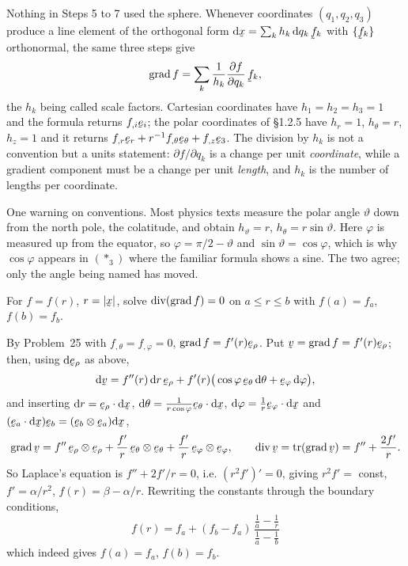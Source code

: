 \begin{remark}%
\label{rem:lame}
Nothing in Steps 5 to 7 used the sphere. Whenever coordinates
$(q_{1},q_{2},q_{3})$ produce a line element of the orthogonal form
$\dl\bx=\sum_{k}h_{k}\,\dl q_{k}\,\bff_{k}$ with $\{\bff_{k}\}$ orthonormal,
the same three steps give
\[
   \grad f=\sum_{k}\frac{1}{h_{k}}\frac{\partial f}{\partial q_{k}}\,\bff_{k},
\]
the $h_{k}$ being called scale factors. Cartesian coordinates have
$h_{1}=h_{2}=h_{3}=1$ and the formula returns $f_{,i}\be_{i}$; the polar
coordinates of \S1.2.5 have $h_{r}=1$, $h_{\theta}=r$, $h_{z}=1$ and it
returns $f_{,r}\ber+r^{-1}f_{,\theta}\beth+f_{,z}\be_{3}$. The division by
$h_{k}$ is not a convention but a units statement: $\partial f/\partial
q_{k}$ is a change per unit \emph{coordinate}, while a gradient component
must be a change per unit \emph{length}, and $h_{k}$ is the number of
lengths per coordinate.

One warning on conventions. Most physics texts measure the polar angle
$\vartheta$ down from the north pole, the colatitude, and obtain
$h_{\vartheta}=r$, $h_{\theta}=r\sin\vartheta$. Here $\varphi$ is measured
up from the equator, so $\varphi=\pi/2-\vartheta$ and
$\sin\vartheta=\cos\varphi$, which is why $\cos\varphi$ appears in
$(\ast_3)$ where the familiar formula shows a sine. The two agree; only the
angle being named has moved.
\end{remark}

\begin{problem}
For $f=f(r)$, $r=|\bx|$, solve $\operatorname{div}(\operatorname{grad} f)=0$ on $a\le r\le b$ with
$f(a)=f_a$, $f(b)=f_b$.
\end{problem}
\begin{solution}
By Problem~25 with $f_{,\theta}=f_{,\varphi}=0$, $\grad f=f'(r)\berho$. Put
$\bv=\grad f=f'(r)\berho$; then, using $\dl\berho$ as above,
\[
\dl\bv=f''(r)\,\dl r\,\berho+f'(r)\big(\cos\varphi\,\beth\,\dl\theta
+\beph\,\dl\varphi\big),
\]
and inserting $\dl r=\berho\cdot\dl\bx$,
$\dl\theta=\tfrac{1}{r\cos\varphi}\beth\cdot\dl\bx$,
$\dl\varphi=\tfrac1r\beph\cdot\dl\bx$ and
$(\be_a\cdot\dl\bx)\be_b=(\be_b\otimes\be_a)\dl\bx$,
\[
\grad\bv=f''\,\berho\otimes\berho+\frac{f'}{r}\,\beth\otimes\beth
+\frac{f'}{r}\,\beph\otimes\beph,\qquad
\dvg\bv=\tr(\grad\bv)=f''+\frac{2f'}{r}.
\]
So Laplace's equation is $f''+2f'/r=0$, i.e. $(r^2f')'=0$, giving
$r^2f'=$ const, $f'=\alpha/r^2$, $f(r)=\beta-\alpha/r$. Rewriting the
constants through the boundary conditions,
\[
\boxed{\,f(r)=f_a+(f_b-f_a)\,\frac{\tfrac1a-\tfrac1r}{\tfrac1a-\tfrac1b}\,}
\]
which indeed gives $f(a)=f_a$, $f(b)=f_b$.
\end{solution}

